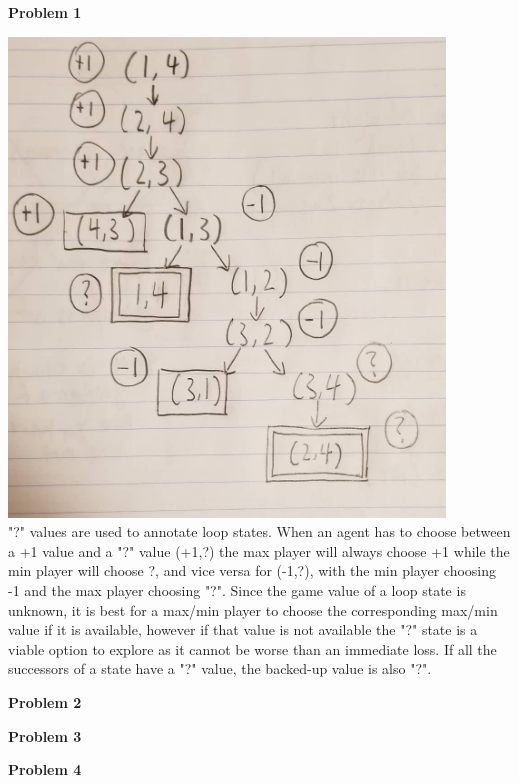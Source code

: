 \documentclass[11pt]{article}
\begin{document}
    \begin{center}
        \Large
        \textbf{Problem 1}
    \end{center}
    \normalsize
    \includegraphics[width=\linewidth]{images/game_tree} \\
    "?" values are used to annotate loop states. When an agent has to choose between a +1 value and a "?" value (+1,?) the max player will always choose +1 while the min player will choose ?, and vice versa for (-1,?), with the min player choosing -1 and the max player choosing "?". Since the game value of a loop state is unknown, it is best for a max/min player to choose the corresponding max/min value if it is available, however if that value is not available the "?" state is a viable option to explore as it cannot be worse than an immediate loss. If all the successors of a state have a "?" value, the backed-up value is also "?".

    \begin{center}
        \Large
        \textbf{Problem 2}
    \end{center}
    \normalsize
    \begin{enumerate}

        
    \end{enumerate}

    \begin{center}
        \Large
        \textbf{Problem 3}
    \end{center}
    \normalsize

    \begin{center}
        \Large
        \textbf{Problem 4}
    \end{center}
    \normalsize


    
\end{document}
